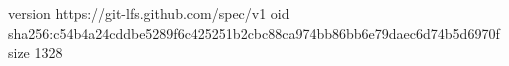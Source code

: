 version https://git-lfs.github.com/spec/v1
oid sha256:c54b4a24cddbe5289f6c425251b2cbc88ca974bb86bb6e79daec6d74b5d6970f
size 1328
